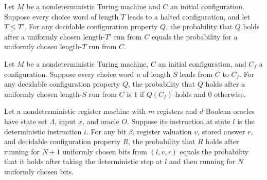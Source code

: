 \begin{lemma}
\label{Complexity.LogProg.randProb_runWith_mono}
\leanok
{}
Let $M$ be a nondeterministic Turing machine and $C$ an initial configuration. Suppose
every choice word of length $T$ leads to a halted configuration, and let $T\le T'$. For
any decidable configuration property $Q$, the probability that $Q$ holds after a
uniformly chosen length-$T'$ run from $C$ equals the probability for a uniformly chosen
length-$T$ run from $C$.
\end{lemma}

\begin{lemma}
\label{Complexity.LogProg.randProb_runWith_const}
\leanok
{}
Let $M$ be a nondeterministic Turing machine, $C$ an initial configuration, and $C_f$ a
configuration. Suppose every choice word $u$ of length $S$ leads from $C$ to $C_f$. For
any decidable configuration property $Q$, the probability that $Q$ holds after a
uniformly chosen length-$S$ run from $C$ is $1$ if $Q(C_f)$ holds and $0$ otherwise.
\end{lemma}

\begin{lemma}
\label{Complexity.LogProg.randProb_narun_det}
\leanok
{}
Let a nondeterministic register machine with $m$ registers and $d$ Boolean oracles have
state set $\Lambda$, input $x$, and oracle $O$. Suppose its instruction at state $l$ is
the deterministic instruction $i$. For any bit $\beta$, register valuation $v$, stored
answer $r$, and decidable configuration property $R$, the probability that $R$ holds
after running for $N+1$ uniformly chosen bits from $(l,v,r)$ equals the probability that
it holds after taking the deterministic step at $l$ and then running for $N$ uniformly
chosen bits.
\end{lemma}

